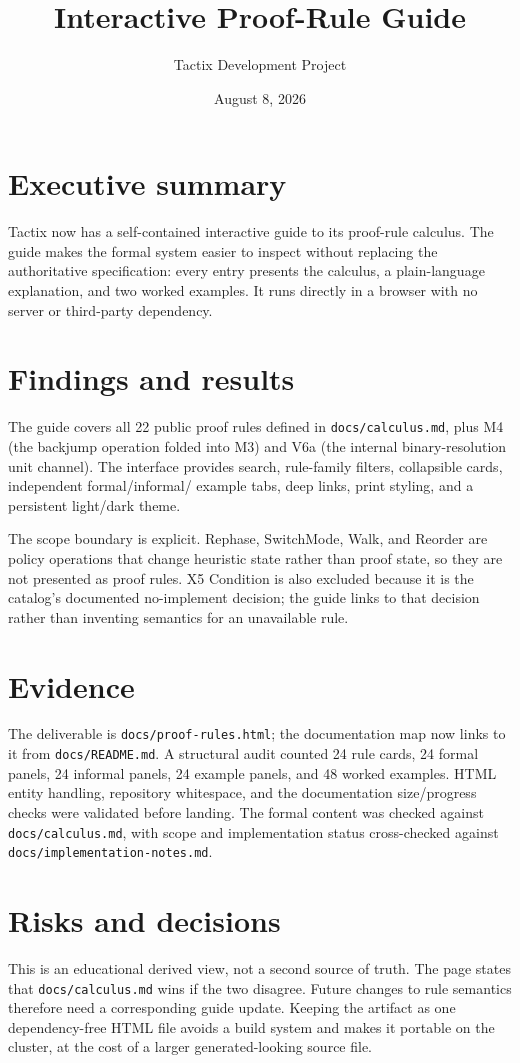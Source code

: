 \documentclass[11pt]{article}
\title{Interactive Proof-Rule Guide}
\author{Tactix Development Project}
\date{August 8, 2026}
\begin{document}
\maketitle

\section*{Executive summary}
Tactix now has a self-contained interactive guide to its proof-rule calculus.
The guide makes the formal system easier to inspect without replacing the
authoritative specification: every entry presents the calculus, a
plain-language explanation, and two worked examples. It runs directly in a
browser with no server or third-party dependency.

\section{Findings and results}
The guide covers all 22 public proof rules defined in
\texttt{docs/calculus.md}, plus M4 (the backjump operation folded into M3) and
V6a (the internal binary-resolution unit channel). The interface provides
search, rule-family filters, collapsible cards, independent formal/informal/
example tabs, deep links, print styling, and a persistent light/dark theme.

The scope boundary is explicit. Rephase, SwitchMode, Walk, and Reorder are
policy operations that change heuristic state rather than proof state, so they
are not presented as proof rules. X5 Condition is also excluded because it is
the catalog's documented no-implement decision; the guide links to that
decision rather than inventing semantics for an unavailable rule.

\section{Evidence}
The deliverable is \texttt{docs/proof-rules.html}; the documentation map now
links to it from \texttt{docs/README.md}. A structural audit counted 24 rule
cards, 24 formal panels, 24 informal panels, 24 example panels, and 48 worked
examples. HTML entity handling, repository whitespace, and the documentation
size/progress checks were validated before landing. The formal content was
checked against \texttt{docs/calculus.md}, with scope and
implementation status cross-checked against
\texttt{docs/implementation-notes.md}.

\section{Risks and decisions}
This is an educational derived view, not a second source of truth. The page
states that \texttt{docs/calculus.md} wins if the two disagree. Future changes
to rule semantics therefore need a corresponding guide update. Keeping the
artifact as one dependency-free HTML file avoids a build system and makes it
portable on the cluster, at the cost of a larger generated-looking source file.
\end{document}
